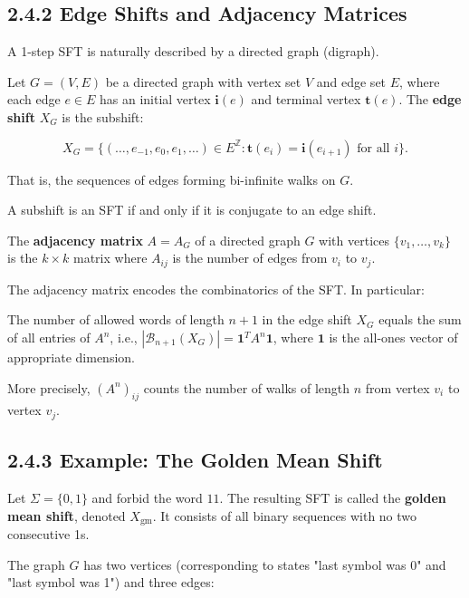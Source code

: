 \subsection{2.4.2 Edge Shifts and Adjacency Matrices}

A 1-step SFT is naturally described by a directed graph (digraph).

\begin{definition}
Let $G = (V, E)$ be a directed graph with vertex set $V$ and edge set $E$, where each edge $e \in E$ has an initial vertex $\mathbf{i}(e)$ and terminal vertex $\mathbf{t}(e)$. The \textbf{edge shift} $X_G$ is the subshift:

\[
X_G = \{ (\ldots, e_{-1}, e_0, e_1, \ldots) \in E^{\mathbb{Z}} : \mathbf{t}(e_i) = \mathbf{i}(e_{i+1}) \text{ for all } i \} .
\]

That is, the sequences of edges forming bi-infinite walks on $G$.
\end{definition}

\begin{theorem}
A subshift is an SFT if and only if it is conjugate to an edge shift.
\end{theorem}

\begin{definition}
The \textbf{adjacency matrix} $A = A_G$ of a directed graph $G$ with vertices $\{ v_1, \ldots, v_k\} $ is the $k \times k$ matrix where $A_{ij}$ is the number of edges from $v_i$ to $v_j$.

The adjacency matrix encodes the combinatorics of the SFT. In particular:
\end{definition}

\begin{proposition}
The number of allowed words of length $n+1$ in the edge shift $X_G$ equals the sum of all entries of $A^n$, i.e., $|\mathcal{B}_{n+1}(X_G)| = \mathbf{1}^T A^n \mathbf{1}$, where $\mathbf{1}$ is the all-ones vector of appropriate dimension.

More precisely, $(A^n)_{ij}$ counts the number of walks of length $n$ from vertex $v_i$ to vertex $v_j$.
\end{proposition}

\subsection{2.4.3 Example: The Golden Mean Shift}

\begin{example}
Let $\Sigma = \{ 0, 1\} $ and forbid the word $11$. The resulting SFT is called the \textbf{golden mean shift}, denoted $X_{\text{gm}}$. It consists of all binary sequences with no two consecutive 1s.

The graph $G$ has two vertices (corresponding to states "last symbol was 0" and "last symbol was 1") and three edges:
\end{example}

